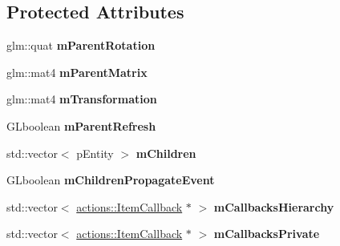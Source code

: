 \subsection*{Protected Attributes}
\begin{DoxyCompactItemize}
\item 
\hypertarget{classfillwave_1_1models_1_1Entity_ae4417f42009ce2d77bac972510f4ddc9}{}glm\+::quat {\bfseries m\+Parent\+Rotation}\label{classfillwave_1_1models_1_1Entity_ae4417f42009ce2d77bac972510f4ddc9}

\item 
\hypertarget{classfillwave_1_1models_1_1Entity_a5bed161efeaa6c9ba49e8c24659a61d9}{}glm\+::mat4 {\bfseries m\+Parent\+Matrix}\label{classfillwave_1_1models_1_1Entity_a5bed161efeaa6c9ba49e8c24659a61d9}

\item 
\hypertarget{classfillwave_1_1models_1_1Entity_a80a2e5b0bc1695a8075b4a0e216835f5}{}glm\+::mat4 {\bfseries m\+Transformation}\label{classfillwave_1_1models_1_1Entity_a80a2e5b0bc1695a8075b4a0e216835f5}

\item 
\hypertarget{classfillwave_1_1models_1_1Entity_a0490ceec51cf87359298fcb77c836baf}{}G\+Lboolean {\bfseries m\+Parent\+Refresh}\label{classfillwave_1_1models_1_1Entity_a0490ceec51cf87359298fcb77c836baf}

\item 
\hypertarget{classfillwave_1_1models_1_1Entity_af7f12c3d43c8defc4cd737387117cc89}{}std\+::vector$<$ p\+Entity $>$ {\bfseries m\+Children}\label{classfillwave_1_1models_1_1Entity_af7f12c3d43c8defc4cd737387117cc89}

\item 
\hypertarget{classfillwave_1_1models_1_1Entity_a9a0eceac5f40cc6f462ab7651cd725b4}{}G\+Lboolean {\bfseries m\+Children\+Propagate\+Event}\label{classfillwave_1_1models_1_1Entity_a9a0eceac5f40cc6f462ab7651cd725b4}

\item 
\hypertarget{classfillwave_1_1models_1_1Entity_ae4f7b1d6eef02eee01addc85be9a6411}{}std\+::vector$<$ \hyperlink{classfillwave_1_1actions_1_1ItemCallback}{actions\+::\+Item\+Callback} $\ast$ $>$ {\bfseries m\+Callbacks\+Hierarchy}\label{classfillwave_1_1models_1_1Entity_ae4f7b1d6eef02eee01addc85be9a6411}

\item 
\hypertarget{classfillwave_1_1models_1_1Entity_abd1895e1cfe2ba0349c8023e2970dc8d}{}std\+::vector$<$ \hyperlink{classfillwave_1_1actions_1_1ItemCallback}{actions\+::\+Item\+Callback} $\ast$ $>$ {\bfseries m\+Callbacks\+Private}\label{classfillwave_1_1models_1_1Entity_abd1895e1cfe2ba0349c8023e2970dc8d}


\end{DoxyCompactItemize}
